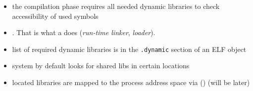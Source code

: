 

\begin{slide}

\begin{itemize}
\item the compilation phase requires all needed dynamic libraries to check
accessibility of used symbols
\item {}. That is what a  does  (\emph{run-time
linker}, \emph{loader}).
\item list of required dynamic libraries is in the \texttt{.dynamic} section of
an ELF object
\item system by default looks for shared libs in certain locations
\item located libraries are mapped to the process address space via
() (will be later)
\end{itemize}
\end{slide}

\label{RUNTIMELINKER}

